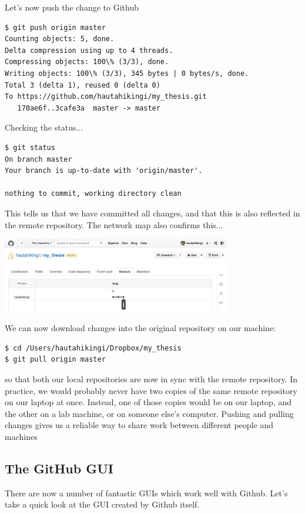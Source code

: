 \documentclass{article}
\begin{document}
Let's now push the change to Github
\begin{lstlisting}
$ git push origin master
Counting objects: 5, done.
Delta compression using up to 4 threads.
Compressing objects: 100\% (3/3), done.
Writing objects: 100\% (3/3), 345 bytes | 0 bytes/s, done.
Total 3 (delta 1), reused 0 (delta 0)
To https://github.com/hautahikingi/my_thesis.git
   170ae6f..3cafe3a  master -> master
\end{lstlisting}
Checking the status...
\begin{lstlisting}
$ git status
On branch master
Your branch is up-to-date with 'origin/master'.

nothing to commit, working directory clean
\end{lstlisting}
This tells us that we have committed all changes, and that this is also reflected in the remote repository. The network map also confirms this...
\begin{center}
\includegraphics[width=10cm]{./auxfiles/Network_update.jpg}
\end{center}
We can now download changes into the original repository on our machine:
\begin{lstlisting}
$ cd /Users/hautahikingi/Dropbox/my_thesis
$ git pull origin master
\end{lstlisting}
so that both our local repositories are now in sync with the remote repository. In practice, we would probably never have two copies of the same remote repository on our laptop at once. Instead, one of those copies would be on our laptop, and the other on a lab machine, or on someone else's computer. Pushing and pulling changes gives us a reliable way to share work between different people and machines


\subsection{The GitHub GUI}

There are now a number of fantastic GUIs which work well with Github. Let's take a quick look at the GUI created by Github itself.
\end{document}
